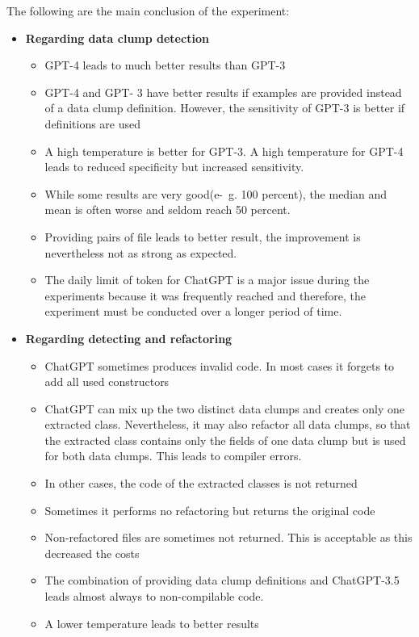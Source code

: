 The following are the main conclusion of the experiment:
\begin{itemize}
\item \textbf{Regarding data clump detection}
\begin{itemize}
    \item GPT-4 leads to much better results than GPT-3
    \item GPT-4 and GPT-
    3 have better results if examples are provided instead of a data clump definition. However, the sensitivity of GPT-3 is better if definitions are used
    \item A high temperature is better for GPT-3. A high temperature for GPT-4 leads to reduced specificity but increased sensitivity. 
    \item While some results are very good(e-~g. 100 percent), the median and mean is often worse and seldom reach 50 percent. 
    \item Providing pairs of file leads to better result, the improvement is nevertheless not as strong as expected. 
    \item The daily limit of token for ChatGPT is a major issue during the experiments because it was frequently reached and therefore, the experiment  must be conducted over a longer period of time. 
\end{itemize}
  \item \textbf{Regarding detecting and refactoring} \begin{itemize}
       \item ChatGPT sometimes produces invalid code. In most cases it forgets to add all used constructors
    \item ChatGPT can mix up the two distinct data clumps and creates only one extracted class. Nevertheless, it may also refactor all data clumps, so that the extracted class contains only the fields of one data clump but is used for both data clumps. This leads to compiler errors.
       \item In other cases, the code of the extracted classes is not returned
       \item Sometimes it performs no refactoring but returns the original code
       \item Non-refactored files are sometimes not returned. This is acceptable as this decreased the costs
       \item The combination of providing data clump definitions and ChatGPT-3.5 leads almost always to non-compilable code.
       \item A lower temperature leads to better results
 
   \end{itemize}
\end{itemize}

